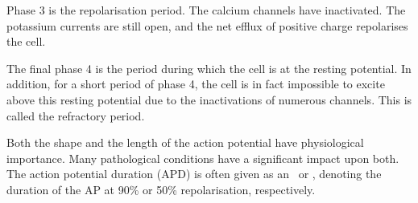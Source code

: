 Phase 3 is the repolarisation period.
The calcium channels have inactivated.
The potassium currents are still open, and the net efflux of positive charge
repolarises the cell.

The final phase 4 is the period during which the cell is at the resting
potential.
In addition, for a short period of phase 4, the cell is in fact
impossible to excite above this resting potential due to the inactivations of
numerous channels.
This is called the refractory period.

Both the shape and the length of the action potential have physiological
importance.
Many pathological conditions have a significant impact upon both.
The action potential duration (APD) is often given as an \apd\ or
\apd[50], denoting the duration of the AP at 90\% or 50\% repolarisation,
respectively.
